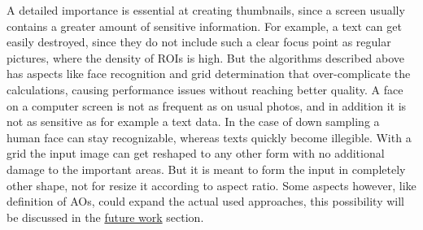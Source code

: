 \documentclass[draft,final]{vutinfth} %
\begin{document}
	A detailed importance is essential at creating thumbnails, since a screen usually contains a greater amount of sensitive information.
	For example, a text can get easily destroyed, since they do not include such a clear focus point as regular pictures, where the density of ROIs is high. 
	But the algorithms described above has aspects like face recognition and grid determination that over-complicate the calculations, causing performance issues without reaching better quality.
	A face on a computer screen is not as frequent as on usual photos, and in addition it is not as sensitive as for example a text data.
	In the case of down sampling a human face can stay recognizable, whereas texts quickly become illegible. 
	With a grid the input image can get reshaped to any other form with no additional damage to the important areas.
	But it is meant to form the input in completely other shape, not for resize it according to aspect ratio.
	Some aspects however, like definition of AOs, could expand the actual used approaches, this possibility will be discussed in the \hyperref[futureWork]{future work} section.
	
\end{document}
